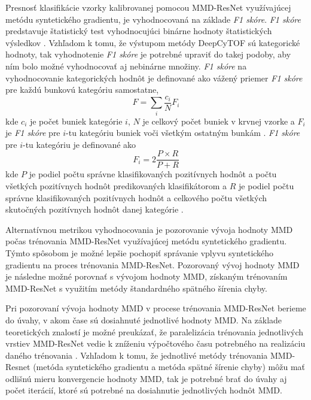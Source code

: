 Presnosť klasifikácie vzorky kalibrovanej pomocou MMD-ResNet využívajúcej metódu syntetického gradientu, je vyhodnocovaná na základe \textit{F1 skóre}. \textit{F1 skóre} predstavuje štatistický test vyhodnocujúci binárne hodnoty štatistických výsledkov \cite{sasaki2007truth}. Vzhľadom k tomu, že výstupom metódy DeepCyTOF sú kategorické hodnoty, tak vyhodnotenie \textit{F1 skóre} je potrebné upraviť do takej podoby, aby ním bolo možné vyhodnocovať aj nebinárne množiny. \textit{F1 skóre} na vyhodnocovanie kategorických hodnôt je definované ako vážený priemer \textit{F1 skóre} pre každú bunkovú kategóriu samostatne, 
\begin{equation}
    F=\sum_i \frac{c_i}{N}F_i
\end{equation}
kde $c_i$ je počet buniek kategórie $i$, $N$ je celkový počet buniek v krvnej vzorke a $F_i$ je \textit{F1 skóre} pre $i$-tu kategóriu buniek voči všetkým ostatným bunkám \cite{Li2017}. \textit{F1 skóre} pre $i$-tu kategóriu je definované ako 
\begin{equation}
F_i=2\frac{P \times R}{P + R}
\end{equation}
kde $P$ je podiel počtu správne klasifikovaných pozitívnych hodnôt a počtu všetkých pozitívnych hodnôt predikovaných klasifikátorom a $R$ je podiel počtu správne klasifikovaných pozitívnych hodnôt a celkového počtu všetkých skutočných pozitívnych hodnôt danej kategórie \cite{sasaki2007truth}.

Alternatívnou metrikou vyhodnocovania je pozorovanie vývoja hodnoty MMD počas trénovania MMD-ResNet využívajúcej metódu syntetického gradientu. Týmto spôsobom je možné lepšie pochopiť správanie vplyvu syntetického gradientu na proces trénovania MMD-ResNet. Pozorovaný vývoj hodnoty MMD je následne možné porovnať s vývojom hodnoty MMD, získaným trénovaním MMD-ResNet s využitím metódy štandardného spätného šírenia chyby.

Pri pozorovaní vývoja hodnoty MMD v procese trénovania MMD-ResNet berieme do úvahy, v akom čase sú dosiahnuté jednotlivé hodnoty MMD. Na základe teoretických znalostí je možné preukázať, že paralelizácia trénovania jednotlivých vrstiev MMD-ResNet vedie k zníženiu výpočtového času potrebného na realizáciu daného trénovania \cite{Jaderberg2016, Czarnecki2017}. Vzhľadom k tomu, že jednotlivé metódy trénovania MMD-Resnet (metóda syntetického gradientu a metóda spätné šírenie chyby) môžu mať odlišnú mieru konvergencie hodnoty MMD, tak je potrebné brať do úvahy aj počet iterácií, ktoré sú potrebné na dosiahnutie jednotlivých hodnôt MMD.

